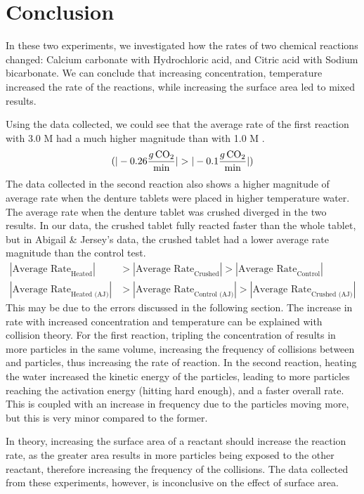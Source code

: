 
\section{Conclusion}
In these two experiments, we investigated how the rates of two chemical reactions changed: Calcium carbonate with Hydrochloric acid, and Citric acid with Sodium bicarbonate. We can conclude that increasing concentration, temperature increased the rate of the reactions, while increasing the surface area led to mixed results.

Using the data collected, we could see that the average rate of the first reaction with 3.0 M  had a much higher magnitude than with 1.0 M . $$ (|-0.26 \defunits| > |-0.1 \defunits|) $$ The data collected in the second reaction also shows a higher magnitude of average rate when the denture tablets were placed in higher temperature water. The average rate when the denture tablet was crushed diverged in the two results. In our data, the crushed tablet fully reacted faster than the whole tablet, but in Abigail \& Jersey's data, the crushed tablet had a lower average rate magnitude than the control test.
\begin{align*}
    |\text{Average Rate}_{\text{Heated}}| &> |\text{Average Rate}_{\text{Crushed}}| > |\text{Average Rate}_{\text{Control}}| \\
    |\text{Average Rate}_{\text{Heated (AJ)}}| &> |\text{Average Rate}_{\text{Control (AJ)}}| > |\text{Average Rate}_{\text{Crushed (AJ)}}|
\end{align*}
This may be due to the errors discussed in the following section. The increase in rate with increased concentration and temperature can be explained with collision theory. For the first reaction, tripling the concentration of  results in more  particles in the same volume, increasing the frequency of collisions between  and  particles, thus increasing the rate of reaction. In the second reaction, heating the water increased the kinetic energy of the particles, leading to more particles reaching the activation energy (hitting hard enough), and a faster overall rate. This is coupled with an increase in frequency due to the particles moving more, but this is very minor compared to the former.

In theory, increasing the surface area of a reactant should increase the reaction rate, as the greater area results in more particles being exposed to the other reactant, therefore increasing the frequency of the collisions. The data collected from these experiments, however, is inconclusive on the effect of surface area.


